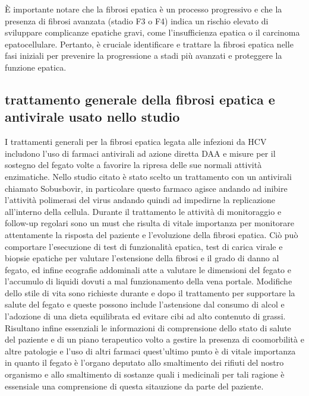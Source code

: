 \documentclass[italian,12pt,a4paper]{article}
\begin{document}
    \vspace{25pt}
    
	È importante notare che la fibrosi epatica è un processo progressivo e che la presenza di fibrosi avanzata (stadio F3 o F4) indica un rischio elevato di sviluppare complicanze epatiche gravi, come l'insufficienza epatica o il carcinoma epatocellulare. Pertanto, è cruciale identificare e trattare la fibrosi epatica nelle fasi iniziali per prevenire la progressione a stadi più avanzati e proteggere la funzione epatica.

    \subsection{trattamento generale della fibrosi epatica e antivirale usato nello studio}
	I trattamenti generali per la fibrosi epatica legata alle infezioni da HCV includono l'uso di farmaci antivirali ad azione diretta DAA e misure per il sostegno del fegato volte a favorire la ripresa delle sue normali attività enzimatiche. Nello studio citato è stato scelto un trattamento con un antivirali chiamato Sobusbovir, in particolare questo farmaco agisce andando ad inibire l'attività polimerasi del virus andando quindi ad impedirne la replicazione all'interno della cellula. Durante il trattamento le attività di monitoraggio e follow-up regolari sono un must che risulta di vitale importanza per monitorare attentamente la risposta del paziente e l'evoluzione della fibrosi epatica. Ciò può comportare l'esecuzione di test di funzionalità epatica, test di carica virale e biopsie epatiche per valutare l'estensione della fibrosi e il grado di danno al fegato, ed infine ecografie addominali atte a valutare le dimensioni del fegato e l'accumulo di liquidi dovuti a mal funzionamento della vena portale. Modifiche dello stile di vita sono richieste durante e dopo il trattamento per supportare la salute del fegato e queste possono include l'astensione dal consumo di alcol e l'adozione di una dieta equilibrata ed evitare cibi ad alto contenuto di grassi. Risultano infine essenziali le informazioni di comprensione dello stato di salute del paziente e di un piano terapeutico volto a gestire la presenza di coomorbilità e altre patologie e l'uso di altri farmaci quest'ultimo punto è di vitale importanza in quanto il fegato è l'organo deputato allo smaltimento dei rifiuti del nostro organismo e allo smaltimento di sostanze quali i medicinali per tali ragione è essensiale una comprensione di questa sitauzione da parte del paziente.
    \\
\end{document}
